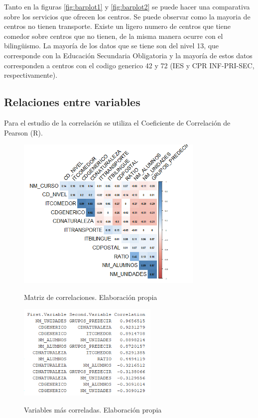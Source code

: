\begin{subappendices}
Tanto en la figuras \ref{fig:barplot1} y \ref{fig:barplot2} se puede hacer una comparativa sobre los servicios que ofrecen los centros. Se puede observar como la mayoria de centros no tienen transporte. Existe un ligero numero de centros que tiene comedor sobre centros que no tienen, de la misma manera ocurre con el bilingüismo. La mayoría de los datos que se tiene son del nivel 13, que corresponde con la Educación Secundaria Obligatoria y la mayoría de estos datos corresponden a centros con el codigo generico 42 y 72 (IES y CPR INF-PRI-SEC, respectivamente).

\subsection{Relaciones entre variables}
Para el estudio de la correlación se utiliza el Coeficiente de Correlación de Pearson (R).
\begin{figure}[htb]
	\centering
	\caption{Matriz de correlaciones. Elaboración propia}
	\includegraphics[width=0.8\textwidth]{recursos/ImagenesR/matrizcorrelacion}
	\label{fig:matrizcorrelaciones}
\end{figure}
\FloatBarrier


\begin{figure}[htb]
	\centering
	\caption{Variables más correladas. Elaboración propia}
	\includegraphics[width=0.6\textwidth]{recursos/ImagenesR/mayorescorrelaciones}
	\label{fig:mayorescorrelaciones}
\end{figure}
\FloatBarrier


\end{subappendices}
